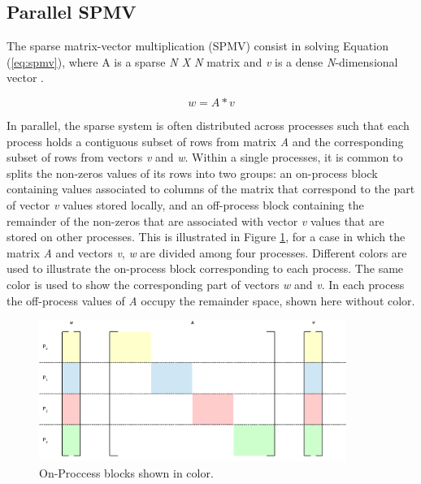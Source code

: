 \subsection*{Parallel SPMV}

The sparse matrix-vector multiplication (SPMV) consist in solving Equation (\ref{eq:spmv}), where A is a sparse \emph{N X N} matrix and \emph{v} is a dense \emph{N}-dimensional vector \cite{BienzGO16}.


\begin{equation}
  w = A * v
\label{eq:spmv}  
\end{equation}

In parallel, the sparse system is often distributed across processes such that each process holds a contiguous subset of rows from matrix \emph{A} and the corresponding subset of rows from vectors \emph{v} and \emph{w}. Within a single processes, it is common to splits the non-zeros values of its rows into two groups: an on-process block containing values associated to columns of the matrix that correspond to the part of vector \emph{v} values stored locally, and an off-process block containing the remainder of the non-zeros that are associated with vector \emph{v} values that are stored on other processes\cite{BienzGO16}. This is illustrated in Figure \ref{fig:Matrix}, for a case in which the matrix \emph{A} and vectors \emph{v}, \emph{w} are divided among four processes. Different colors are used to illustrate the on-process block corresponding to each process. The same color is used to show the corresponding part of vectors \emph{w} and \emph{v}. In each process the off-process values of \emph{A} occupy the remainder space, shown here without color.

\medskip

\begin{figure}[h!]
    \centering
    \includegraphics[width=100mm]{Plots/HybridProgramming/matrix.png}
    \caption{On-Proccess blocks shown in color.}
    \label{fig:Matrix}
\end{figure}

\medskip



